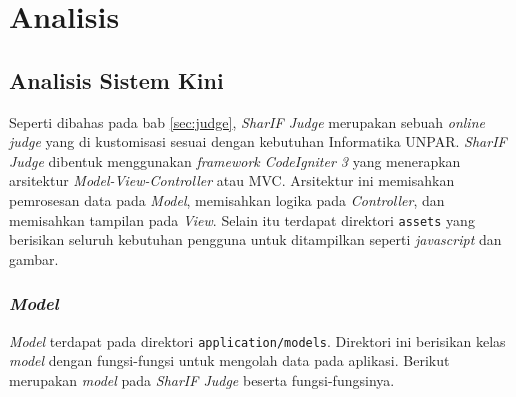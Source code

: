 \chapter{Analisis}
\label{chap:analisis}
\section{Analisis Sistem Kini}
Seperti dibahas pada bab \ref{sec:judge}, \textit{SharIF Judge} merupakan sebuah \textit{online judge} yang di kustomisasi sesuai dengan kebutuhan Informatika UNPAR. \textit{SharIF Judge} dibentuk menggunakan \textit{framework CodeIgniter 3} yang menerapkan  arsitektur \textit{Model-View-Controller} atau MVC. Arsitektur ini memisahkan pemrosesan data pada \textit{Model}, memisahkan logika pada \textit{Controller}, dan memisahkan tampilan pada \textit{View}. Selain itu terdapat direktori \texttt{assets} yang berisikan seluruh kebutuhan pengguna untuk ditampilkan seperti \textit{javascript} dan gambar.

\subsection{\textit{Model}}
\textit{Model} terdapat pada direktori \texttt{application/models}. Direktori ini berisikan kelas \textit{model} dengan fungsi-fungsi untuk mengolah data pada aplikasi. Berikut merupakan \textit{model} pada \textit{SharIF Judge} beserta fungsi-fungsinya.
